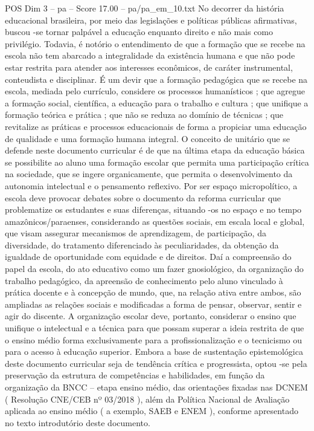 \begin{textsample}{POS Dim 3 – pa – Score 17.00 – pa/pa\_em\_10.txt}
No decorrer da história educacional brasileira, por meio das legislações e políticas públicas afirmativas, buscou -se tornar palpável a educação enquanto direito e não mais como privilégio.
Todavia, é notório o entendimento de que a formação que se recebe na escola não tem abarcado a integralidade da existência humana e que não pode estar restrita para atender aos interesses econômicos, de caráter instrumental, conteudista e disciplinar.
É um devir que a formação pedagógica que se recebe na escola, mediada pelo currículo, considere os processos humanísticos ; que agregue a formação social, científica, a educação para o trabalho e cultura ; que unifique a formação teórica e prática ; que não se reduza ao domínio de técnicas ; que revitalize as práticas e processos educacionais de forma a propiciar uma educação de qualidade e uma formação humana integral.
O conceito de unitário que se defende neste documento curricular é de que na última etapa da educação básica se possibilite ao aluno uma formação escolar que permita uma participação crítica na sociedade, que se ingere organicamente, que permita o desenvolvimento da autonomia intelectual e o pensamento reflexivo.
Por ser espaço micropolítico, a escola deve provocar debates sobre o documento da reforma curricular que problematize os estudantes e suas diferenças, situando -os no espaço e no tempo amazônicos/paraenses, considerando as questões sociais, em escala local e global, que visam assegurar mecanismos de aprendizagem, de participação, da diversidade, do tratamento diferenciado às peculiaridades, da obtenção da igualdade de oportunidade com equidade e de direitos.
Daí a compreensão do papel da escola, do ato educativo como um fazer gnosiológico, da organização do trabalho pedagógico, da apreensão de conhecimento pelo aluno vinculado à prática docente e à concepção de mundo, que, na relação ativa entre ambos, são ampliadas as relações sociais e modificadas a forma de pensar, observar, sentir e agir do discente.
A organização escolar deve, portanto, considerar o ensino que unifique o intelectual e a técnica para que possam superar a ideia restrita de que o ensino médio forma exclusivamente para a profissionalização e o tecnicismo ou para o acesso à educação superior.
Embora a base de sustentação epistemológica deste documento curricular seja de tendência crítica e progressista, optou -se pela preservação da estrutura de competências e habilidades, em função da organização da BNCC – etapa ensino médio, das orientações fixadas nas DCNEM ( Resolução CNE/CEB nº 03/2018 ), além da Política Nacional de Avaliação aplicada ao ensino médio ( a exemplo, SAEB e ENEM ), conforme apresentado no texto introdutório deste documento.

\end{textsample}
